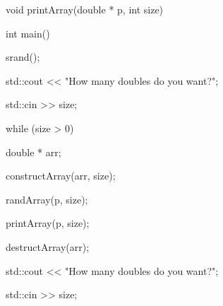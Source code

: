 \begin{consolethree}[escapeinside=||]
void printArray(double * p, int size)

{

}



int main()

{

    srand();

    std::cout << "How many doubles do you want?";

    std::cin >> size;



    while (size > 0)

    {

        double * arr;

        constructArray(arr, size);

        randArray(p, size);

        printArray(p, size);

        destructArray(arr);

        std::cout << "How many doubles do you want?";

        std::cin >> size;

    }

}

\end{consolethree}

